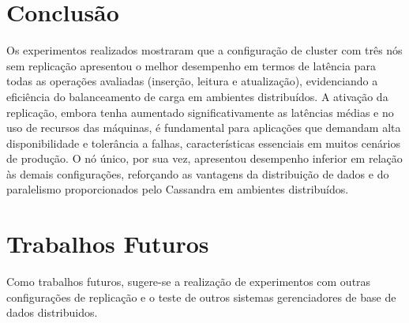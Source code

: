\section{Conclusão}

Os experimentos realizados mostraram que a configuração de cluster com três nós sem replicação apresentou o melhor desempenho em termos de latência para
todas as operações avaliadas (inserção, leitura e atualização), evidenciando a eficiência do balanceamento de carga em ambientes distribuídos. 
A ativação da replicação, embora tenha aumentado significativamente as latências médias e no uso de recursos das máquinas, é fundamental para aplicações que demandam alta disponibilidade 
e tolerância a falhas, características essenciais em muitos cenários de produção.
O nó único, por sua vez, apresentou desempenho inferior em relação às demais configurações,
reforçando as vantagens da distribuição de dados e do paralelismo proporcionados pelo Cassandra em ambientes distribuídos.

\section{Trabalhos Futuros}

Como trabalhos futuros, sugere-se a realização de experimentos com outras configurações de replicação e o teste de outros sistemas gerenciadores de base de dados distribuidos.
